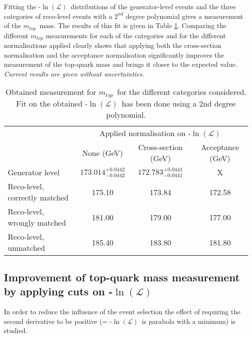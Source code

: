 \documentclass[a4paper,10pt]{article}
\newcommand{\NegLL}{-$\ln(\mathcal{L})$~}
\newcommand{\mTop}{$m_{top}$~}
\begin{document}
Fitting the \NegLL distributions of the generator-level events and the three categories of reco-level events with a $2^{nd}$ degree polynomial gives a measurement of the \mTop mass. The results of this fit is given in Table \ref{table::mTopResults}.
Comparing the different $m_{top}$ measurements for each of the categories and for the different normalisations applied clearly shows that applying both the cross-section normalisation and the acceptance normalisation significantly improves the measurement of the top-quark mass and brings it closer to the expected value.\\
\textit{Current results are given without uncertainties.}

\begin{table}[h!t]
 \caption{Obtained measurement for \mTop for the different categories considered. Fit on the obtained \NegLL has been done using a 2nd degree polynomial.}\label{table::mTopResults}
 \centering
 \begin{tabular}{l|c|c|c}
					& \multicolumn{3}{c}{Applied normalisation on \NegLL} 			\\
					& None (GeV) 			& Cross-section (GeV) 	& Acceptance (GeV)	\\
  \hline
  Generator level 			& $173.014^{+0.0442}_{-0.0442}$	& $172.783^{+0.0441}_{-0.0441}$	& X 		\\
  Reco-level, correctly matched 	& 175.10 	& 173.84 		& 172.58 	\\
  Reco-level, wrongly matched 		& 181.00 	& 179.00 		& 177.00 	\\
  Reco-level, unmatched 		& 185.40 	& 183.80 		& 181.80 	
 \end{tabular}
\end{table}

\subsection{Improvement of top-quark mass measurement by applying cuts on \NegLL}
In order to reduce the influence of the event selection the effect of requiring the second derivative to be positive (= \NegLL is parabola with a minimum) is studied.
\end{document}
